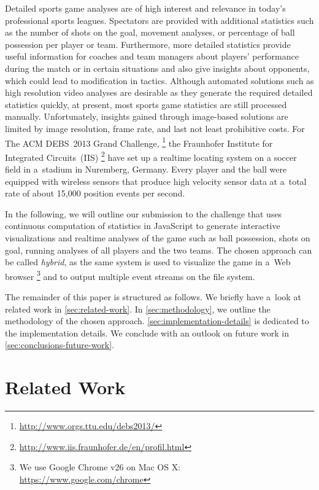 \documentclass{sig-alternate}
\newcommand{\inlinelistingsize}{\fontsize{8pt}{11pt}}
\let\oldurl\url
\renewcommand{\url}[1]{\inlinelistingsize\oldurl{#1}}
\begin{document}
Detailed sports game analyses are of high interest and
relevance in today’s professional sports leagues.
Spectators are provided with additional statistics
such as the number of shots on the goal, movement analyses,
or percentage of ball possession per player or team.
Furthermore, more detailed statistics provide useful information
for coaches and team managers about players' performance
during the match or in certain situations
and also give insights about opponents,
which could lead to modification in tactics.
Although automated solutions
such as high resolution video analyses are desirable
as they generate the required detailed statistics quickly,
at present, most sports game statistics are still processed manually.
Unfortunately, insights gained through image-based solutions
are limited by image resolution, frame rate, and last not least
prohibitive costs.
For The ACM DEBS~2013 Grand Challenge,%
\footnote{\url{http://www.orgs.ttu.edu/debs2013/}}
the Fraunhofer Institute for Integrated Circuits~(IIS)%
\footnote{\url{http://www.iis.fraunhofer.de/en/profil.html}}
have set up a realtime locating system on a soccer field
in a~stadium in Nuremberg, Germany.
Every player and the ball were equipped with wireless sensors
that produce high velocity sensor data at a~total rate
of about 15,000 position events per second.

In the following, we will outline our submission to the challenge
that uses continuous computation of statistics in JavaScript
to generate interactive visualizations and realtime analyses
of the game such as ball possession, shots on goal,
running analyses of all players and the two teams.
The chosen approach can be called \emph{hybrid},
as the same system is used to visualize the game in a~Web browser%
\footnote{We use Google Chrome v26 on Mac OS X: \url{https://www.google.com/chrome}}
and to output multiple event streams on the file system.

The remainder of this paper is structured as follows.
We briefly have a~look at related work in \autoref{sec:related-work}.
In \autoref{sec:methodology}, we outline
the methodology of the chosen approach.
\autoref{sec:implementation-details}
is dedicated to the implementation details.
We conclude with an outlook on future work in \autoref{sec:conclusions-future-work}.

\section{Related Work}
\label{sec:related-work}
\end{document}
